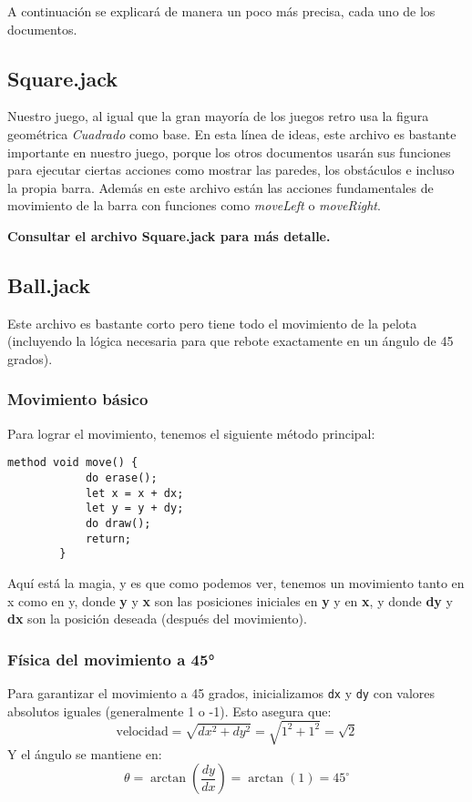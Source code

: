 \documentclass{report}
\begin{document}
	A continuación se explicará de manera un poco más precisa, cada uno de los documentos.
	
	\subsection{Square.jack}
	Nuestro juego, al igual que la gran mayoría de los juegos retro usa la figura geométrica \emph{Cuadrado} como base. En esta línea de ideas, este archivo es bastante importante en nuestro juego, porque los otros documentos usarán sus funciones para ejecutar ciertas acciones como mostrar las paredes, los obstáculos e incluso la propia barra. Además en este archivo están las acciones fundamentales de movimiento de la barra con funciones como \emph{moveLeft} o \emph{moveRight}.  
	
	\textbf{Consultar el archivo Square.jack para más detalle.}
	
	\subsection{Ball.jack}
	Este archivo es bastante corto pero tiene todo el movimiento de la pelota (incluyendo la lógica necesaria para que rebote exactamente en un ángulo de 45 grados). 
	
	\subsubsection{Movimiento básico}
	Para lograr el movimiento, tenemos el siguiente método principal:
	
	\begin{lstlisting}[caption=Método move() de la pelota]
		method void move() {
			do erase();
			let x = x + dx;
			let y = y + dy;
			do draw();
			return;
		}
	\end{lstlisting}
	
	Aquí está la magia, y es que como podemos ver, tenemos un movimiento tanto en x como en y, donde \textbf{y} y \textbf{x} son las posiciones iniciales en \textbf{y} y en \textbf{x}, y donde \textbf{dy} y \textbf{dx} son la posición deseada (después del movimiento). 
	
	\subsubsection{Física del movimiento a 45°}
	Para garantizar el movimiento a 45 grados, inicializamos \texttt{dx} y \texttt{dy} con valores absolutos iguales (generalmente 1 o -1). Esto asegura que:
	\[
	\text{velocidad} = \sqrt{dx^2 + dy^2} = \sqrt{1^2 + 1^2} = \sqrt{2}
	\]
	Y el ángulo se mantiene en:
	\[
	\theta = \arctan\left(\frac{dy}{dx}\right) = \arctan(1) = 45^\circ
	\]
	
\end{document}

